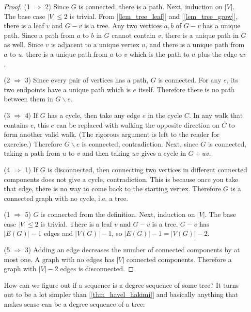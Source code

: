         \begin{proof}
            (1 $\Rightarrow$ 2) Since $G$ is connected, there is a path. Next, induction on $|V|$. The base case $|V| \leq 2$ is trivial. From [\ref{lem_tree_leaf}] and [\ref{lem_tree_grow}], there is a leaf $v$ and $G-v$ is a tree. Any two vertices $a,b$ of $G-v$ has a unique path. Since a path from $a$ to $b$ in $G$ cannot contain $v$, there is a unique path in $G$ as well. Since $v$ is adjacent to a unique vertex $u$, and there is a unique path from $a$ to $u$, there is a unique path from $a$ to $v$ which is the path to $u$ plus the edge $uv$.
            
            (2 $\Rightarrow$ 3) Since every pair of vertices has a path, $G$ is connected. For any $e$, its two endpoints have a unique path which is $e$ itself. Therefore there is no path between them in $G \backslash e$.
            
            (3 $\Rightarrow$ 4) If $G$ has a cycle, then take any edge $e$ in the cycle $C$. In any walk that contains $e$, this $e$ can be replaced with walking the opposite direction on $C$ to form another valid walk. (The rigorous argument is left to the reader for exercise.) Therefore $G \backslash e$ is connected, contradiction. Next, since $G$ is connected, taking a path from $u$ to $v$ and then taking $uv$ gives a cycle in $G+uv$.
            
            (4 $\Rightarrow$ 1) If $G$ is disconnected, then connecting two vertices in different connected components does not give a cycle, contradiction. This is because once you take that edge, there is no way to come back to the starting vertex. Therefore $G$ is a connected graph with no cycle, i.e. a tree.
            
            (1 $\Rightarrow$ 5) $G$ is connected from the definition. Next, induction on $|V|$. The base case $|V| \leq 2$ is trivial. There is a leaf $v$ and $G-v$ is a tree. $G-v$ has $|E(G)|-1$ edges and $|V(G)|-1$, so $|E(G)|-1 = |V(G)|-2$.
            
            (5 $\Rightarrow$ 3) Adding an edge decreases the number of connected components by at most one. A graph with no edges has $|V|$ connected components. Therefore a graph with $|V|-2$ edges is disconnected.
        \end{proof}
        
        How can we figure out if a sequence is a degree sequence of some tree? It turns out to be a lot simpler than [\ref{thm_havel_hakimi}] and basically anything that makes sense can be a degree sequence of a tree:
        
